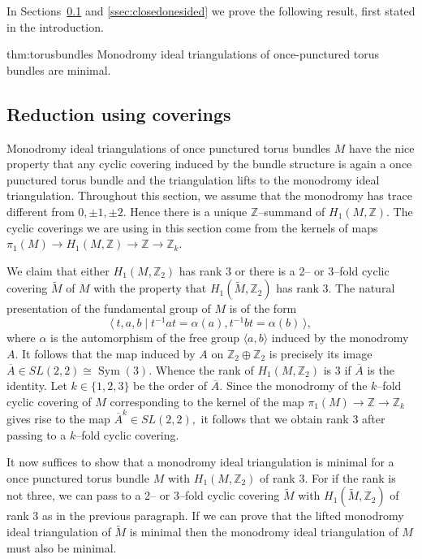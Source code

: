 \documentclass[a4paper]{gtart}
\def\manifold{M}
\def\Z{\mathbb{Z}}
\DeclareMathOperator{\Sym}{Sym}
\theoremstyle{plain}
\theoremstyle{definition}
\theoremstyle{remark}
\numberwithin{equation}{section}
\begin{document}
In Sections~\ref{subsec:Reduction using coverings} and \ref{ssec:closedonesided} we prove the following result, first stated in the introduction.

\begin{reptheorem}{thm:torusbundles}
  Monodromy ideal triangulations of once-punctured torus bundles are minimal.
\end{reptheorem}


\subsection{Reduction using coverings}
\label{subsec:Reduction using coverings}

Monodromy ideal triangulations of once punctured torus bundles $\manifold$ have the nice property that any cyclic covering induced by the bundle structure is again a once punctured torus bundle and the triangulation lifts to the monodromy ideal triangulation. Throughout this section, we assume that the monodromy has trace different from $0, \pm 1, \pm 2.$ Hence there is a unique $\Z$--summand of $H_1(\manifold, \Z).$ The cyclic coverings we are using in this section come from the kernels of maps $\pi_1(\manifold) \to H_1(\manifold,\Z) \to \Z \to \Z_k.$ 

We claim that either $H_1(\manifold,\Z_2)$ has rank 3 or there is a  2-- or 3--fold cyclic covering $\widetilde{\manifold}$ of $\manifold$ with the property that $H_1(\widetilde{\manifold},\Z_2)$ has rank $3.$
The natural presentation of the fundamental group of $\manifold$ is of the form
\[\langle \ t, a, b \mid t^{-1}at = \alpha(a), t^{-1}bt = \alpha(b)\ \rangle,\]
where $\alpha$ is the automorphism of the free group $\langle a, b\rangle$ induced by the monodromy $A.$ 
It follows that the  map induced by $A$ on $\Z_2\oplus \Z_2$ is precisely its image $\overline{A} \in SL(2,2) \cong \Sym(3).$
Whence the rank of $H_1(\manifold,\Z_2)$ is 3 if $\overline{A}$ is the identity. Let $k\in \{1, 2, 3\}$ be the order of $\overline{A}.$ 
Since the monodromy of the $k$--fold cyclic covering of $\manifold$ corresponding to the kernel of the map $\pi_1(\manifold) \to \Z \to \Z_k$ gives rise to the map $\overline{A}^k \in SL(2,2),$ it follows that we obtain rank 3 after passing to a $k$--fold cyclic covering. 

It now suffices to show that a monodromy ideal triangulation is minimal for a once punctured torus bundle $\manifold$ with $H_1(\manifold, \Z_2)$ of rank $3.$ For if the rank is not three, we can pass to a 2-- or 3--fold cyclic covering $\widetilde{\manifold}$ with $H_1(\widetilde{\manifold},\Z_2)$ of rank $3$ as in the previous paragraph. If we can prove that the lifted monodromy ideal triangulation of $\widetilde{\manifold}$ is minimal then the monodromy ideal triangulation of $\manifold$ must also be minimal. 
\end{document}
